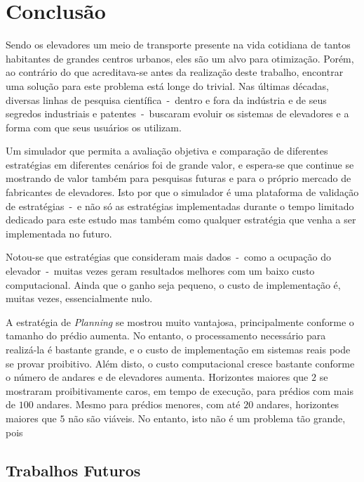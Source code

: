 \chapter{\label{chap:conclusion}Conclusão}

Sendo os elevadores um meio de transporte presente na vida cotidiana de tantos
habitantes de grandes centros urbanos, eles são um alvo para otimização. Porém,
ao contrário do que acreditava-se antes da realização deste trabalho, encontrar
uma solução para este problema está longe do trivial. Nas últimas décadas,
diversas linhas de pesquisa científica~-~dentro e fora da indústria e de seus
segredos industriais e patentes~-~buscaram evoluir os sistemas de elevadores e a
forma com que seus usuários os utilizam.

Um simulador que permita a avaliação objetiva e comparação de diferentes
estratégias em diferentes cenários foi de grande valor, e espera-se que continue
se mostrando de valor também para pesquisas futuras e para o próprio mercado de
fabricantes de elevadores. Isto por que o simulador é uma plataforma de
validação de estratégias~-~e não só as estratégias implementadas durante o tempo
limitado dedicado para este estudo mas também como qualquer estratégia que venha
a ser implementada no futuro.

Notou-se que estratégias que consideram mais dados~-~como a ocupação do
elevador~-~muitas vezes geram resultados melhores com um baixo custo
computacional. Ainda que o ganho seja pequeno, o custo de implementação é,
muitas vezes, essencialmente nulo.

A estratégia de \textit{Planning} se mostrou muito vantajosa, principalmente
conforme o tamanho do prédio aumenta. No entanto, o processamento necessário
para realizá-la é bastante grande, e o custo de implementação em sistemas reais
pode se provar proibitivo. Além disto, o custo computacional cresce bastante
conforme o número de andares e de elevadores aumenta. Horizontes maiores que $2$
se mostraram proibitivamente caros, em tempo de execução, para prédios com mais
de $100$ andares. Mesmo para prédios menores, com até $20$ andares, horizontes
maiores que $5$ não são viáveis. No entanto, isto não é um problema tão grande,
pois

\section{Trabalhos Futuros}

